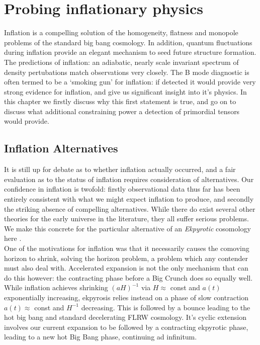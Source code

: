 \documentclass[a4paper,10pt]{article}
\begin{document}
\section{Probing inflationary physics}

Inflation is a compelling solution of the homogeneity, flatness and monopole problems of the standard big bang cosmology. In addition, quantum fluctuations during inflation provide an elegant mechanism to seed future structure formation. The predictions of inflation: an adiabatic, nearly scale invariant spectrum of density pertubations match observations very closely. The B mode diagnostic is often termed to be a `smoking gun' for inflation: if detected it would provide very strong evidence for inflation, and give us significant insight into it's physics. In this chapter we firstly discuss why this first statement is true, and go on to discuss what additional constraining power a detection of primordial tensors would provide.

\subsection{Inflation Alternatives}

It is still up for debate as to whether inflation actually occurred, and a fair evaluation as to the status of inflation requires consideration of alternatives. Our confidence in inflation is twofold: firstly observational data thus far has been entirely consistent with what we might expect inflation to produce, and secondly the striking absence of compelling alternatives. While there do exist several other theories for the early universe in the literature, they all suffer serious problems. We make this concrete for the particular alternative of an \textit{Ekpyrotic} cosomology here \cite{CMBPol}.\\

One of the motivations for inflation was that it necessarily causes the comoving horizon to shrink, solving the horizon problem, a problem which any contender must also deal with. Accelerated expansion is not the only mechanism that can do this however: the contracting phase before a Big Crunch does so equally well. While inflation achieves shrinking $(aH)^{-1}$ via $H\approx$ const and $a(t)$ exponentially increasing, ekpyrosis relies instead on a phase of slow contraction $a(t)\approx$ const and $H^{-1}$ decreasing. This is followed by a bounce leading to the hot big bang and standard decelerating FLRW cosmology. It's cyclic extension involves our current expansion to be followed by a contracting ekpyrotic phase, leading to a new hot Big Bang phase, continuing ad infinitum.\\
\end{document}
